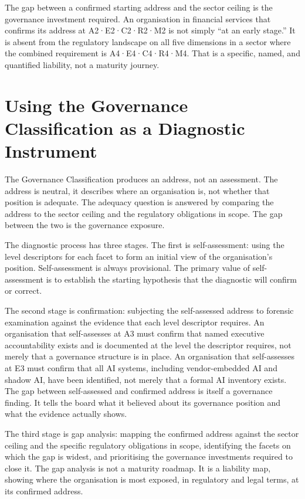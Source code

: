 The gap between a confirmed starting address and the sector ceiling is the governance investment required. An organisation in financial services that confirms its address at A2·E2·C2·R2·M2 is not simply ``at an early stage.'' It is absent from the regulatory landscape on all five dimensions in a sector where the combined requirement is A4·E4·C4·R4·M4. That is a specific, named, and quantified liability, not a maturity journey.

\scenebreak

\section{Using the Governance Classification as a Diagnostic Instrument}

The Governance Classification produces an address, not an assessment. The address is neutral, it describes where an organisation is, not whether that position is adequate. The adequacy question is answered by comparing the address to the sector ceiling and the regulatory obligations in scope. The gap between the two is the governance exposure.

The diagnostic process has three stages. The first is self-assessment: using the level descriptors for each facet to form an initial view of the organisation's position. Self-assessment is always provisional. The primary value of self-assessment is to establish the starting hypothesis that the diagnostic will confirm or correct.

The second stage is confirmation: subjecting the self-assessed address to forensic examination against the evidence that each level descriptor requires. An organisation that self-assesses at A3 must confirm that named executive accountability exists and is documented at the level the descriptor requires, not merely that a governance structure is in place. An organisation that self-assesses at E3 must confirm that all AI systems, including vendor-embedded AI and shadow AI, have been identified, not merely that a formal AI inventory exists. The gap between self-assessed and confirmed address is itself a governance finding. It tells the board what it believed about its governance position and what the evidence actually shows.

The third stage is gap analysis: mapping the confirmed address against the sector ceiling and the specific regulatory obligations in scope, identifying the facets on which the gap is widest, and prioritising the governance investments required to close it. The gap analysis is not a maturity roadmap. It is a liability map, showing where the organisation is most exposed, in regulatory and legal terms, at its confirmed address.

